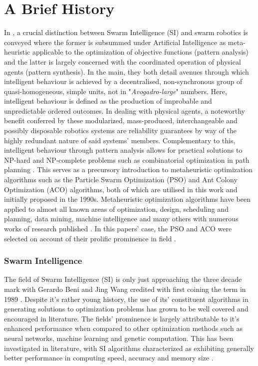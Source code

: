 \documentclass{report}
\begin{document}
\section{A Brief History}
In \cite{Beni2005a}, a crucial distinction between Swarm Intelligence (SI) and swarm robotics is conveyed where the former is subsummed under Artificial Intelligence as meta-heuristic applicable to the optimization of objective functions (pattern analysis) and the latter is largely concerned with the coordinated operation of physical agents (pattern synthesis). In the main, they both detail avenues through which intelligent behaviour is achieved by a decentralised, non-synchronous group of quasi-homogeneous, simple units, not in "\textit{Avogadro-large}" numbers. Here, intelligent behaviour is defined as the production of improbable and unpredictable ordered outcomes. In dealing with physical agents, a noteworthy benefit conferred by these modularized, mass-produced, interchangeable and possibly disposable robotics systems are reliability guarantees by way of the highly redundant nature of said systems' members. Complementary to this, intelligent behaviour through pattern analysis allows for practical solutions to NP-hard and NP-complete problems such as combinatorial optimization in path planning \cite{Yan2012}. This serves as a precursory introduction to metaheuristic optimization algorithms such as the Particle Swarm Optimization (PSO) \cite{Kennedy1995} and Ant Colony Optimization (ACO) \cite{Dorigo1997} algorithms, both of which are utilised in this work and initially proposed in the 1990s. Metaheuristic optimization algorithms have been applied to almost all known areas of optimization, design, scheduling and planning, data mining, machine intelligence and many others with numerous works of research published \cite{Yang2011}. In this papers' case, the PSO and ACO were selected on account of their prolific prominence in field \cite{Selvi2010}.

\subsubsection{Swarm Intelligence}
The field of Swarm Intelligence (SI) is only just approaching the three decade mark with Gerardo Beni and Jing Wang credited with first coining the term in 1989 \cite{Garg2009}. Despite it's rather young history, the use of its' constituent algorithms in generating solutions to optimization problems has grown to be well covered and encouraged in literature. The fields' prominence is largely attributable to it's enhanced performance when compared to other optimization methods such as neural networks, machine learning and genetic computation. This has been investigated in literature, with SI algorithms characterized as exhibiting generally better performance in computing speed, accuracy and memory size \cite{Tran2016}.
\end{document}
